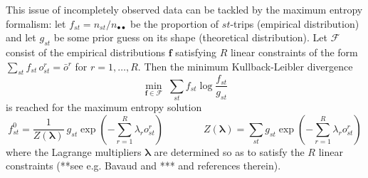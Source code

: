 \documentclass{bmcart}
\begin{document}
This issue of incompletely observed data can be tackled by the maximum entropy formalism: let $f_{st}=n_{st}/n_{\bullet\bullet}$ be the proportion of $st$-trips (empirical distribution) and let $g_{st}$ be some prior guess on its shape (theoretical distribution). Let $\mathcal{F}$ consist of the empirical distributions $\mathbf{f}$ satisfying $R$ linear constraints of the form $\sum_{st}f_{st}\, o^r_{st}=\bar{o}^r$ for $r=1,\ldots, R$. Then the minimum Kullback-Leibler divergence 
\begin{displaymath}
\min_{\mathbf{f}\in\mathcal{F}}\;  \sum_{st}f_{st}\log \frac{f_{st}}{g_{st}}
\end{displaymath}
is reached for the maximum entropy solution  
\begin{equation}
\label{MaxEnt}
f^0_{st}=\frac{1}{Z(\bm{\lambda})}\: g_{st}\exp(-\sum_{r=1}^R \lambda_r o^r_{st})\qquad\qquad Z(\bm{\lambda})=\sum_{st}g_{st}\exp(-\sum_{r=1}^R \lambda_r o^r_{st})
\end{equation}
where the Lagrange multipliers $\bm{\lambda}$ are determined  so as to satisfy the $R$ linear constraints (**see e.g. Bavaud and *** and references therein). 
\end{document}
